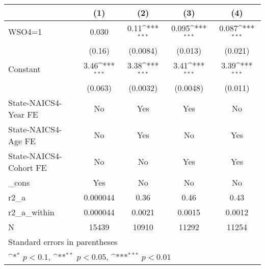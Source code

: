 {
\def\sym#1{\ifmmode^{#1}\else\(^{#1}\)\fi}
\begin{tabular}{l*{4}{c}}
\hline\hline
                    &\multicolumn{1}{c}{(1)}         &\multicolumn{1}{c}{(2)}         &\multicolumn{1}{c}{(3)}         &\multicolumn{1}{c}{(4)}         \\
\hline
WSO4=1              &       0.030         &        0.11\sym{***}&       0.095\sym{***}&       0.087\sym{***}\\
                    &      (0.16)         &    (0.0084)         &     (0.013)         &     (0.021)         \\
[1em]
Constant            &        3.46\sym{***}&        3.38\sym{***}&        3.41\sym{***}&        3.39\sym{***}\\
                    &     (0.063)         &    (0.0032)         &    (0.0048)         &     (0.011)         \\
[1em]
State-NAICS4-Year FE&          No         &         Yes         &         Yes         &          No         \\
[1em]
State-NAICS4-Age FE &          No         &         Yes         &          No         &         Yes         \\
[1em]
State-NAICS4-Cohort FE&          No         &          No         &         Yes         &         Yes         \\
[1em]
\_cons              &         Yes         &          No         &          No         &          No         \\
\hline
r2\_a                &    0.000044         &        0.36         &        0.46         &        0.43         \\
r2\_a\_within         &    0.000044         &      0.0021         &      0.0015         &      0.0012         \\
N                   &       15439         &       10910         &       11292         &       11254         \\
\hline\hline
\multicolumn{5}{l}{\footnotesize Standard errors in parentheses}\\
\multicolumn{5}{l}{\footnotesize \sym{*} \(p<0.1\), \sym{**} \(p<0.05\), \sym{***} \(p<0.01\)}\\
\end{tabular}
}
